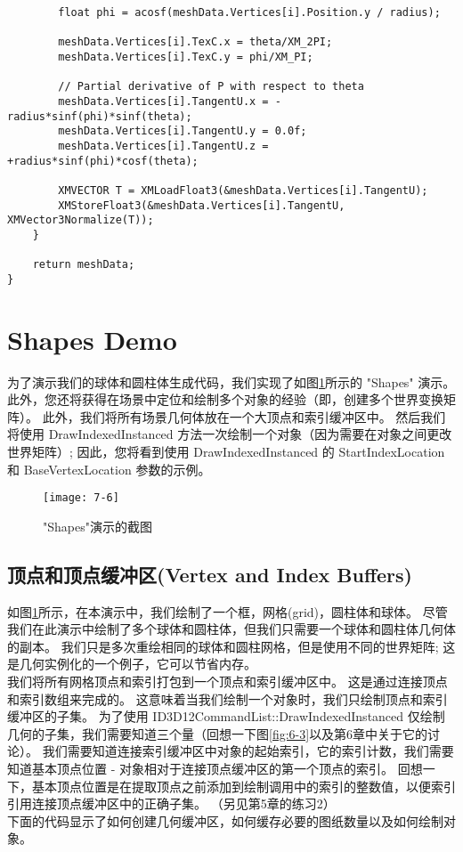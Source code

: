 \begin{lstlisting}
        float phi = acosf(meshData.Vertices[i].Position.y / radius);

        meshData.Vertices[i].TexC.x = theta/XM_2PI;
        meshData.Vertices[i].TexC.y = phi/XM_PI;

        // Partial derivative of P with respect to theta
        meshData.Vertices[i].TangentU.x = -radius*sinf(phi)*sinf(theta);
        meshData.Vertices[i].TangentU.y = 0.0f;
        meshData.Vertices[i].TangentU.z = +radius*sinf(phi)*cosf(theta);

        XMVECTOR T = XMLoadFloat3(&meshData.Vertices[i].TangentU);
        XMStoreFloat3(&meshData.Vertices[i].TangentU, XMVector3Normalize(T));
    }

    return meshData;
}
\end{lstlisting}

\section{Shapes Demo}
\begin{flushleft}
为了演示我们的球体和圆柱体生成代码，我们实现了如图\ref{fig:7-6}所示的 "Shapes" 演示。 此外，您还将获得在场景中定位和绘制多个对象的经验（即，创建多个世界变换矩阵）。 此外，我们将所有场景几何体放在一个大顶点和索引缓冲区中。 然后我们将使用 DrawIndexedInstanced 方法一次绘制一个对象（因为需要在对象之间更改世界矩阵）; 因此，您将看到使用 DrawIndexedInstanced 的 StartIndexLocation 和 BaseVertexLocation 参数的示例。\\
\end{flushleft}

\begin{figure}[h]
    \texttt{[image: 7-6]}
    \centering
    \caption{"Shapes"演示的截图}
    \label{fig:7-6}
\end{figure}
\clearpage

\subsection{顶点和顶点缓冲区(Vertex and Index Buffers)}
\begin{flushleft}
如图\ref{fig:7-6}所示，在本演示中，我们绘制了一个框，网格(grid)，圆柱体和球体。 尽管我们在此演示中绘制了多个球体和圆柱体，但我们只需要一个球体和圆柱体几何体的副本。 我们只是多次重绘相同的球体和圆柱网格，但是使用不同的世界矩阵; 这是几何实例化的一个例子，它可以节省内存。\\
我们将所有网格顶点和索引打包到一个顶点和索引缓冲区中。 这是通过连接顶点和索引数组来完成的。 这意味着当我们绘制一个对象时，我们只绘制顶点和索引缓冲区的子集。 为了使用 ID3D12CommandList::DrawIndexedInstanced 仅绘制几何的子集，我们需要知道三个量（回想一下图\ref{fig:6-3}以及第6章中关于它的讨论）。 我们需要知道连接索引缓冲区中对象的起始索引，它的索引计数，我们需要知道基本顶点位置 - 对象相对于连接顶点缓冲区的第一个顶点的索引。 回想一下，基本顶点位置是在提取顶点之前添加到绘制调用中的索引的整数值，以便索引引用连接顶点缓冲区中的正确子集。 （另见第5章的练习2）\\

下面的代码显示了如何创建几何缓冲区，如何缓存必要的图纸数量以及如何绘制对象。
\end{flushleft}

